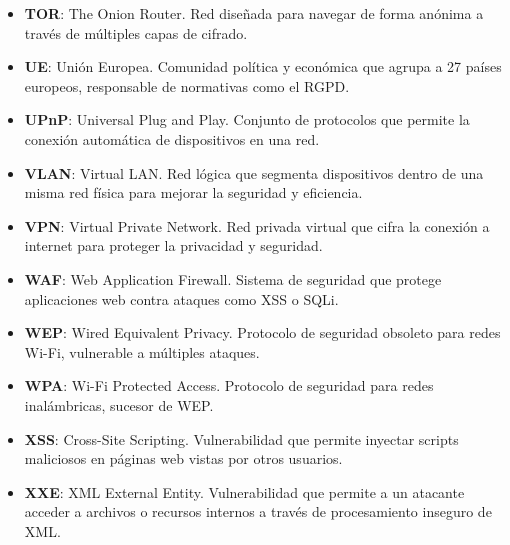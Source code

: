 \documentclass[a4paper, 11pt]{article}
\begin{document}
\begin{itemize}
    \item \textbf{TOR}: The Onion Router. Red diseñada para navegar de forma anónima a través de múltiples capas de cifrado.

    \item \textbf{UE}: Unión Europea. Comunidad política y económica que agrupa a 27 países europeos, responsable de normativas como el RGPD.

    \item \textbf{UPnP}: Universal Plug and Play. Conjunto de protocolos que permite la conexión automática de dispositivos en una red.

    \item \textbf{VLAN}: Virtual LAN. Red lógica que segmenta dispositivos dentro de una misma red física para mejorar la seguridad y eficiencia.

    \item \textbf{VPN}: Virtual Private Network. Red privada virtual que cifra la conexión a internet para proteger la privacidad y seguridad.

    \item \textbf{WAF}: Web Application Firewall. Sistema de seguridad que protege aplicaciones web contra ataques como XSS o SQLi.

    \item \textbf{WEP}: Wired Equivalent Privacy. Protocolo de seguridad obsoleto para redes Wi-Fi, vulnerable a múltiples ataques.

    \item \textbf{WPA}: Wi-Fi Protected Access. Protocolo de seguridad para redes inalámbricas, sucesor de WEP.

    \item \textbf{XSS}: Cross-Site Scripting. Vulnerabilidad que permite inyectar scripts maliciosos en páginas web vistas por otros usuarios.

    \item \textbf{XXE}: XML External Entity. Vulnerabilidad que permite a un atacante acceder a archivos o recursos internos a través de procesamiento inseguro de XML.
\end{itemize}
\end{document}
